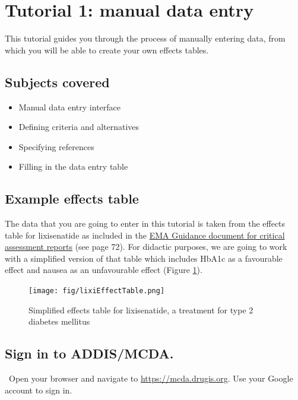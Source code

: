 \documentclass[00_mcda_tutorial.tex]{subfiles}
\begin{document}
\section*{Tutorial 1: manual data entry}
\addtocounter{section}{1}

This tutorial guides you through the process of manually entering data, from which you will be able to create your own effects tables.

\subsection*{Subjects covered}
\begin{itemize}
    \item Manual data entry interface
    \item Defining criteria and alternatives
    \item Specifying references
    \item Filling in the data entry table
\end{itemize}

\subsection*{Example effects table}
The data that you are going to enter in this tutorial is taken from the effects table for lixisenatide as included in the \href{https://www.ema.europa.eu/documents/template-form/day-80-assessment-report-overview-d120-loq-template-guidance-rev-1019_en.docx}{EMA Guidance document for critical assessment reports} (see page 72).  For didactic purposes, we are going to work with a simplified version of that table which includes HbA1c as a favourable effect and nausea as an unfavourable effect (Figure \ref{fig:lixisenatide_effect_table}).

\begin{figure}[!ht]
    \centering
    \texttt{[image: fig/lixiEffectTable.png]}
    \caption{Simplified effects table for lixisenatide, a treatment for type 2 diabetes mellitus}
    \label{fig:lixisenatide_effect_table}
\end{figure}

\subsection*{Sign in to ADDIS/MCDA.}
\leftpointright \, Open your browser and navigate to \href{https://mcda.drugis.org}{https://mcda.drugis.org}.
Use your Google account to sign in.
\end{document}
